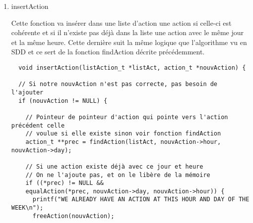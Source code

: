 \documentclass[11pt]{article}
\begin{document}
\begin{enumerate}
\begin{lstlisting}
   action_t **findAction(listAction_t *listAct, char hour[2], char day) {
  action_t **prec =
      NULL; // Pointeur d'un pointeur contenant l'action précédente
  if (checkHour(hour) && checkDay(day)) {
    prec = listAct;
    action_t *curr = *listAct; // Un pointeur vers notre action actuelle

    // Tant qu'on n'as pas trouvé l'action voulue et qu'on est avant
    // chronologiquement
    while (curr && compareAction(curr, day, hour)) {
      prec = &(curr->suiv);
      curr = curr->suiv;
    }
  }
  return prec;
}
\end{lstlisting}


\item insertAction
\label{sec:org7ffd7f1}

Cette fonction va insérer dans une liste d'action une action si celle-ci
est cohérente et si il n'existe pas déjà dans la liste une action avec le
même jour et la même heure.
Cette dernière suit la même logique que l'algorithme vu en SDD et ce sert
de la fonction findAction décrite précédemment.

\begin{lstlisting}
  void insertAction(listAction_t *listAct, action_t *nouvAction) {

  // Si notre nouvAction n'est pas correcte, pas besoin de l'ajouter
  if (nouvAction != NULL) {

    // Pointeur de pointeur d'action qui pointe vers l'action précédent celle
    // voulue si elle existe sinon voir fonction findAction
    action_t **prec = findAction(listAct, nouvAction->hour, nouvAction->day);

    // Si une action existe déjà avec ce jour et heure
    // On ne l'ajoute pas, et on le libère de la mémoire
    if ((*prec) != NULL &&
	equalAction(*prec, nouvAction->day, nouvAction->hour)) {
      printf("WE ALREADY HAVE AN ACTION AT THIS HOUR AND DAY OF THE WEEK\n");
      freeAction(nouvAction);


\end{lstlisting}
\end{enumerate}
\end{document}
